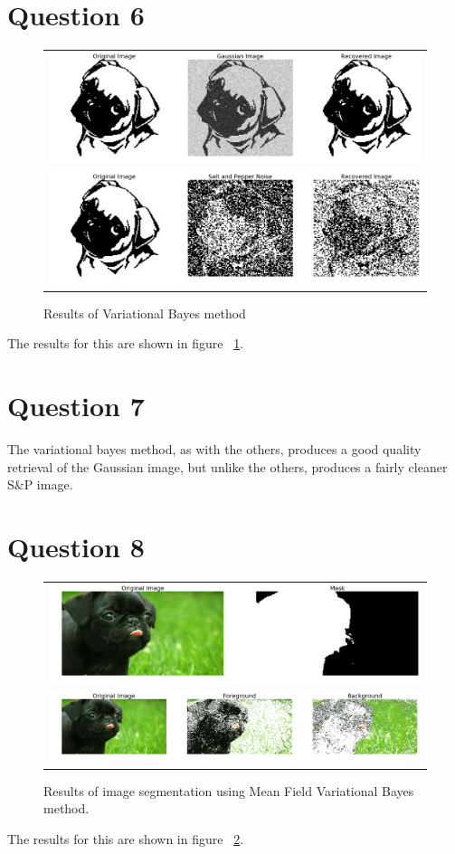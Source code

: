 \documentclass[]{article}
\begin{document}
    \section*{Question 6}
        \begin{figure}[h]
            \centering
            \begin{tabular}{c}
                \includegraphics[width=0.5\linewidth]{output_10_0.png}\\
                \includegraphics[width=0.5\linewidth]{output_10_1.png}
            \end{tabular}
            \caption{Results of Variational Bayes method}
            \label{fig:q6}
        \end{figure}
        \par The results for this are shown in figure ~\ref{fig:q6}.

    \section*{Question 7}
        \par The variational bayes method, as with the others, produces a good quality retrieval of the Gaussian image, but unlike the others, produces a fairly cleaner S\&P image.
    \section*{Question 8}
    \begin{figure}[h]
        \centering
        \begin{tabular}{c}
            \includegraphics[width=0.5\linewidth]{output_12_1.png}\\
            \includegraphics[width=0.5\linewidth]{output_14_0.png}
        \end{tabular}
        \caption{Results of image segmentation using Mean Field Variational Bayes method.}
        \label{fig:q8}
    \end{figure}
    \par The results for this are shown in figure ~\ref{fig:q8}.
\end{document}
